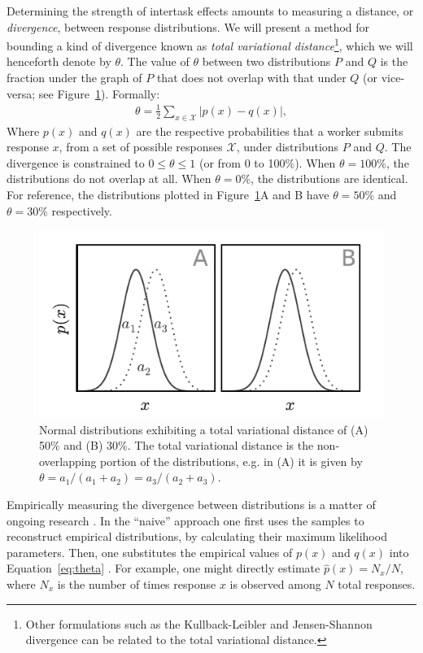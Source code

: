 \documentclass{sigchi}
\begin{document}
Determining the strength of intertask effects amounts to measuring a 
distance, or \textit{divergence}, between response distributions.
We will present a method for bounding a kind of divergence known as 
\textit{total variational distance}\footnote{
  Other formulations such as the Kullback-Leibler and 
  Jensen-Shannon divergence can be related to the total variational
  distance.
}, which we will henceforth denote by $\theta$.
The value of $\theta$ between two distributions $P$ and $Q$ 
is the fraction under the graph of $P$ that does not overlap with that
under $Q$ (or vice-versa; see Figure~\ref{fig:l1_example}).  
Formally:
\begin{align}
  \theta = \frac{1}{2}\sum_{x \in \mathcal{X}} \left| p(x) - q(x) \right|,
	\label{eq:theta}
\end{align}
Where $p(x)$ and $q(x)$ are the respective probabilities 
that a worker submits response $x$, from a set of possible responses 
$\mathcal{X}$, under distributions $P$ and $Q$.
The divergence is constrained to 
$0 \leq \theta \leq 1$ (or from 0 to 100\%).
When $\theta = 100\%$, the distributions do not overlap at all.  
When $\theta = 0\%$, the distributions are identical.
For reference, the distributions plotted in 
Figure~\ref{fig:l1_example}A and B have $\theta=50\%$ and $\theta=30\%$ 
respectively.

\begin{figure}
	\centering
	\includegraphics[scale=1.0]{figs/normal_example.pdf}
	\caption{
	  	Normal distributions exhibiting a total variational distance
		of (A) 50\% and (B) 30\%.  The total variational distance is 
		the non-overlapping portion of the distributions, e.g. in
		(A) it is given by 
		$\theta = a_1 / (a_1 + a_2) = a_3 / (a_2 + a_3)$.
	}
	\label{fig:l1_example}
\end{figure}

Empirically measuring the divergence between distributions
is a matter of ongoing
research \cite{val-thesis,batu2013testing,chan2014optimal}.
In the ``naive'' approach one first uses the samples to reconstruct 
empirical
distributions, by calculating their maximum likelihood parameters.
Then, one substitutes the empirical values of $p(x)$ and $q(x)$ into 
Equation~\ref{eq:theta} \cite{batu2013testing}.  
For example, one might directly estimate $\hat{p}(x) = N_x/N$, 
where $N_x$ is the number of times response $x$ is observed among $N$ 
total responses.
\end{document}
